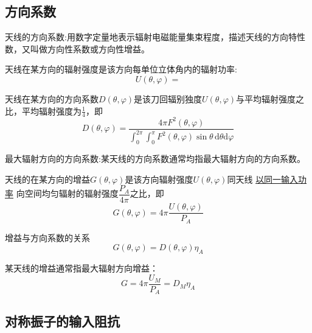     \subsection{方向系数}
    天线的方向系数:用数字定量地表示辐射电磁能量集束程度，描述天线的方向特性数，又叫做方向性系数或方向性增益。

    \begin{definition}[辐射强度]
        天线在某方向的辐射强度是该方向每单位立体角内的辐射功率:
        \begin{equation}
            U(\theta,\varphi)=
        \end{equation}
    \end{definition}

    \begin{definition}[方向系数]
        天线在某方向的方向系数$D(\theta,\varphi)$是该刀回辐别独度$U(\theta,\varphi)$与平均辐射强度之比，平均辐射强度为$\frac{1}{4}$，即
        \begin{equation}
            D(\theta,\varphi)=\frac{4\pi F^2(\theta,\varphi)}{\int_{0}^{2\pi}\int_{0}^{\pi}F^2(\theta,\varphi)\sin\theta\,\mathrm{d}\theta\mathrm{d}\varphi}
        \end{equation}

        最大辐射方向的方向系数:某天线的方向系数通常均指最大辐射方向的方向系数。

    \end{definition}

    \begin{definition}[天线增益]
        天线的在某方向的增益$G(\theta,\varphi)$是该方向辐射强度$U(\theta,\varphi)$同天线 \underline{以同一输入功率} 向空间均匀辐射的辐射强度$\dfrac{P_A}{4\pi}$之比，即
        \begin{equation}
            G(\theta,\varphi)=4\pi \frac{U(\theta,\varphi)}{P_A}
        \end{equation}

        增益与方向系数的关系
        \begin{equation}
            G(\theta,\varphi)=D(\theta,\varphi)\eta_A
        \end{equation}

        某天线的增益通常指最大辐射方向增益：
        \begin{equation}
            G=4\pi \frac{U_M}{P_A}=D_M\eta_A
        \end{equation}
    \end{definition}
    \subsection{对称振子的输入阻抗}
    
